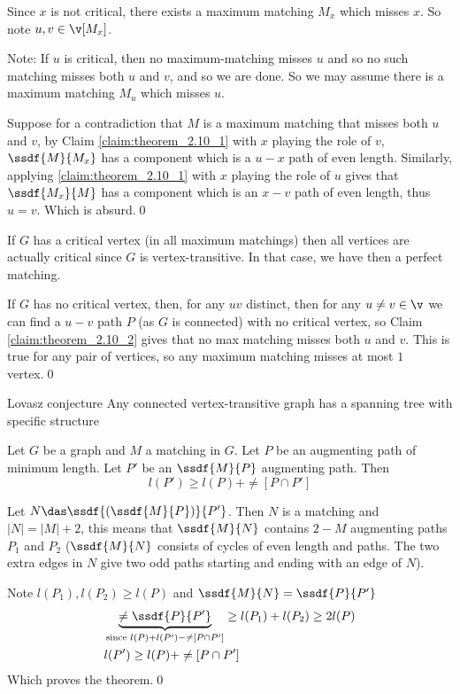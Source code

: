 \begin{prf}
\begin{prf}
\begin{itemize}
            Since $x$ is not critical, there exists a maximum matching $M_x$ which misses $x$. So note $u, v \in \v[M_x]$.

            Note: If $u$ is critical, then no maximum-matching misses $u$ and so no such matching misses both $u$ and $v$, and so we are done. So we may assume there is a maximum matching $M_u$ which misses $u$.

            Suppose for a contradiction that $M$ is a maximum matching that misses both $u$ and $v$, by Claim \ref{claim:theorem_2.10_1} with $x$ playing the role of $v$, $\ssdf{M}{M_x}$ has a component which is a $u - x$ path of even length. Similarly, applying \ref{claim:theorem_2.10_1} with $x$ playing the role of $u$ gives that $\ssdf{M_x}{M}$ has a component which is an $x - v$ path of even length, thus $u = v$. Which is absurd.\qed
        \end{itemize}
    \end{prf}
    If $G$ has a critical vertex (in all maximum matchings) then all vertices are actually critical since $G$ is vertex-transitive. In that case, we have then a perfect matching.

    If $G$ has no critical vertex, then, for any $uv$ distinct, then for any $u \neq v \in \v$ we can find a $u - v$ path $P$ (as $G$ is connected) with no critical vertex, so Claim \ref{claim:theorem_2.10_2} gives that no max matching misses both $u$ and $v$. This is true for any pair of vertices, so any maximum matching misses at most $1$ vertex.\qed
\end{prf}
\begin{customtheorem}{Lovasz conjecture}
\label{theorem:lovasz}
    Any connected vertex-transitive graph has a spanning tree with specific structure
\end{customtheorem}
\begin{customlemma}{2.12}
\label{lemma:2.12}
    Let $G$ be a graph and $M$ a matching in $G$. Let $P$ be an augmenting path of minimum length. Let $P'$ be an $\ssdf{M}{P}$ augmenting path. Then 
    \begin{equation*}
        l(P') \geq l(P) + \ne[P \cap P']
    \end{equation*}
\end{customlemma}
\begin{prf}
    Let $N \das \ssdf{(\ssdf{M}{P})}{P'}$. Then $N$ is a matching and $|N| = |M| + 2$, this means that $\ssdf{M}{N}$ contains $2 - M$ augmenting paths $P_1$ and $P_2$ ($\ssdf{M}{N}$ consists of cycles of even length and paths. The two extra edges in $N$ give two odd paths starting and ending with an edge of $N$).

    Note $l(P_1), l(P_2) \geq l(P)$ and $\ssdf{M}{N} = \ssdf{P}{P'}$
    \begin{align*}
        &\underbrace{\ne{\ssdf{P}{P'}}}_{\text{since }l(P) + l(P') - \ne[P \cap P']} \geq l(P_1) + l(P_2) \geq 2l(P)\\
        &l(P') \geq l(P) + \ne[P \cap P']
    \end{align*}
    Which proves the theorem.\qed
\end{prf}
